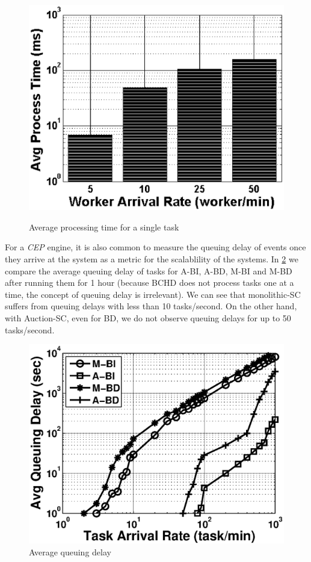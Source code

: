 \begin{figure}[h]
{        \label{fig:runtime_bchd}
        \includegraphics[width = 0.45\columnwidth]{figures/run_time_bchd.eps}
    }
    \vspace{-0.15in}
    \caption{Average processing time for a single task}
    \label{fig:runtime}
\end{figure}

For a \emph{CEP} engine, it is also common to measure the queuing delay of events \cite{Wu06} once they arrive at the system as a metric for the scalablility of the systems. In \cref{fig:queue} we compare the average queuing delay of tasks for A-BI, A-BD, M-BI and M-BD after running them for 1 hour (because BCHD does not process tasks one at a time, the concept of queuing delay is irrelevant). We can see that monolithic-SC suffers from queuing delays with less than 10 tasks/second. On the other hand, with Auction-SC, even for BD, we do not observe queuing delays for up to 50 tasks/second.

\begin{figure}[h]
	\centering
	\includegraphics[width = 0.75\columnwidth]{figures/queue.eps}
	\vspace{-0.1in}
	\caption{Average queuing delay}\label{fig:queue}
\end{figure}


